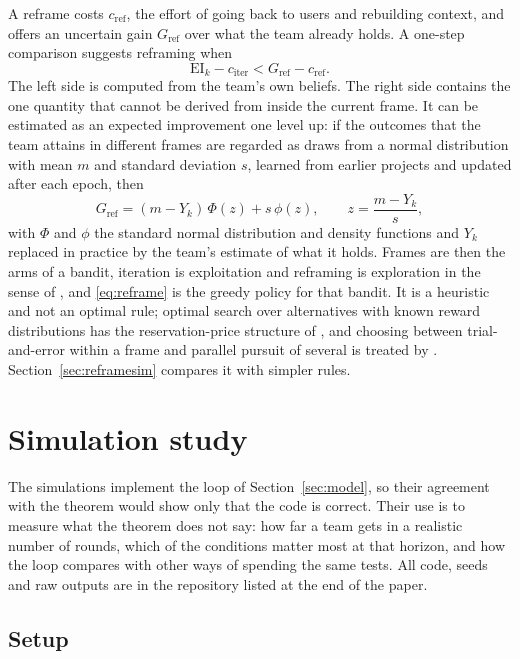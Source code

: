 \documentclass[10pt,twocolumn]{article}
\theoremstyle{definition}
\begin{document}
A reframe costs $c_{\mathrm{ref}}$, the effort of going back to users and rebuilding context, and offers an uncertain gain $G_{\mathrm{ref}}$ over what the team already holds. A one-step comparison suggests reframing when
\begin{equation}
\label{eq:reframe}
\mathrm{EI}_k-c_{\mathrm{iter}}<G_{\mathrm{ref}}-c_{\mathrm{ref}} .
\end{equation}
The left side is computed from the team's own beliefs. The right side contains the one quantity that cannot be derived from inside the current frame. It can be estimated as an expected improvement one level up: if the outcomes that the team attains in different frames are regarded as draws from a normal distribution with mean $m$ and standard deviation $s$, learned from earlier projects and updated after each epoch, then
\begin{equation}
\label{eq:gref}
G_{\mathrm{ref}}=(m-Y_k)\,\Phi(z)+s\,\phi(z),\qquad z=\frac{m-Y_k}{s},
\end{equation}
with $\Phi$ and $\phi$ the standard normal distribution and density functions and $Y_k$ replaced in practice by the team's estimate of what it holds. Frames are then the arms of a bandit, iteration is exploitation and reframing is exploration in the sense of \citet{march1991}, and \eqref{eq:reframe} is the greedy policy for that bandit. It is a heuristic and not an optimal rule; optimal search over alternatives with known reward distributions has the reservation-price structure of \citet{weitzman1979}, and choosing between trial-and-error within a frame and parallel pursuit of several is treated by \citet{sommerloch2004}. Section~\ref{sec:reframesim} compares it with simpler rules.

\section{Simulation study}
\label{sec:sim}

The simulations implement the loop of Section~\ref{sec:model}, so their agreement with the theorem would show only that the code is correct. Their use is to measure what the theorem does not say: how far a team gets in a realistic number of rounds, which of the conditions matter most at that horizon, and how the loop compares with other ways of spending the same tests. All code, seeds and raw outputs are in the repository listed at the end of the paper.

\subsection{Setup}
\label{sec:setup}
\end{document}
